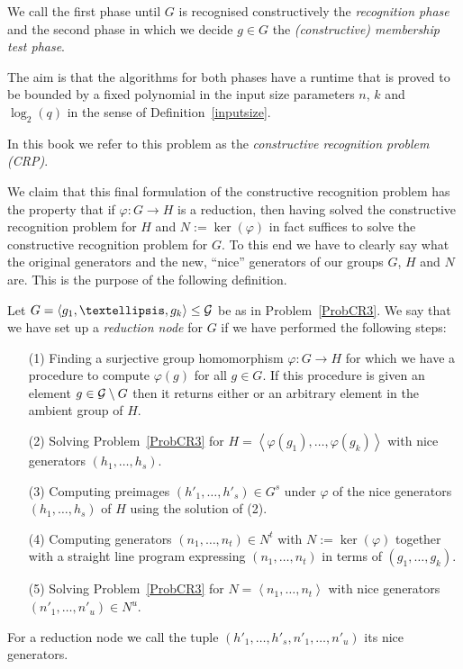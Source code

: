 \begin{Problem}
We call the first phase until $G$ is
recognised constructively the \emph{recognition phase} and the second
phase in which we decide $g \in G$ the \emph{(constructive) membership test phase}.
%
%

The aim is that the algorithms for both phases have a runtime that is proved
to be bounded by a fixed polynomial in the input size parameters $n$, $k$
and $\log_2(q)$ in the sense of Definition~\ref{inputsize}.

In this book we refer to this problem as the \emph{constructive recognition
problem (CRP)}.
%
\proofend
\end{Problem}

We claim that this final formulation of the constructive recognition
problem has the property that if $\varphi : G \to H$ is a reduction, then
having solved the constructive recognition problem for $H$ and $N :=
\ker(\varphi)$ in fact suffices to solve the constructive recognition
problem for $G$. To this end we have to
clearly say what the original generators and the new, ``nice'' generators
of our groups $G$, $H$ and $N$ are. This is the purpose of the following
definition.

\begin{Def}
\label{reducnode}
%
Let $G = \left< g_1, \ldots, g_k \right> \le \GG$ be as in 
Problem~\ref{ProbCR3}.
We say that we have set up a \emph{reduction node} for $G$ if we have
performed the following steps:
\begin{itemize}
\item[(1)] Finding a surjective group homomorphism $\varphi : G \to H$ for
which we have a procedure to compute $\varphi(g)$ for all $g \in G$.
If this procedure is given an element $g \in \mathcal{G} \setminus G$ then it
returns either {\fail} or an arbitrary element in the ambient group of $H$.
\item[(2)] Solving Problem~\ref{ProbCR3} for $H = \left< \varphi(g_1),
\ldots, \varphi(g_k) \right>$ with nice generators $(h_1, \ldots, h_s)$.
\item[(3)] Computing preimages $(h'_1, \ldots, h'_s) \in G^s$ under $\varphi$
of the nice generators $(h_1, \ldots, h_s)$ of $H$ using the solution
of (2).
%
\item[(4)] Computing generators $(n_1, \ldots, n_t) \in N^t$ with $N :=
\ker(\varphi)$ together with a straight line program expressing
$(n_1, \ldots, n_t)$ in terms of $(g_1, \ldots, g_k)$.
%
\item[(5)] Solving Problem~\ref{ProbCR3} for $N = \left< n_1, \ldots, n_t
\right>$ with nice generators $(n'_1, \ldots, n'_u) \in N^u$.
\end{itemize}
For a reduction node we call the tuple $(h'_1, \ldots, h'_s, n'_1, \ldots,
n'_u)$ its nice generators.
\end{Def}

